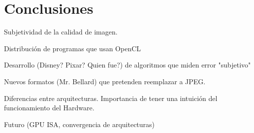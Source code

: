 
\chapter{Conclusiones}\label{ch:conclusiones}

Subjetividad de la calidad de imagen.

Distribución de programas que usan OpenCL

Desarrollo (Disney? Pixar? Quien fue?) de algoritmos que miden error "subjetivo"

Nuevos formatos (Mr. Bellard) que pretenden reemplazar a JPEG.

Diferencias entre arquitecturas. Importancia de tener una intuición del funcionamiento del Hardware.

Futuro (GPU ISA, convergencia de arquitecturas)
